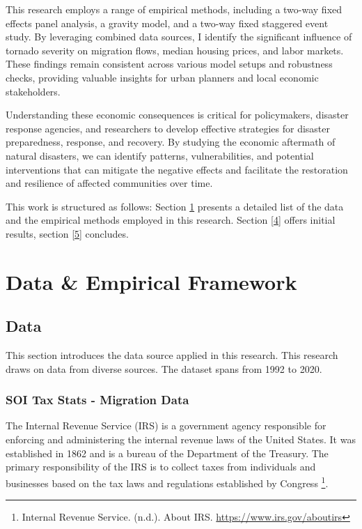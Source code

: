 \documentclass[letterpaper]{article}
\begin{document}
This research employs a range of empirical methods, including a two-way fixed effects panel analysis, a gravity model, and a two-way fixed staggered event study. By leveraging combined data sources, I identify the significant influence of tornado severity on migration flows, median housing prices, and labor markets. These findings remain consistent across various model setups and robustness checks, providing valuable insights for urban planners and local economic stakeholders.

Understanding these economic consequences is critical for policymakers, disaster response agencies, and researchers to develop effective strategies for disaster preparedness, response, and recovery. By studying the economic aftermath of natural disasters, we can identify patterns, vulnerabilities, and potential interventions that can mitigate the negative effects and facilitate the restoration and resilience of affected communities over time. 

This work is structured as follows: Section \ref{3} presents a detailed list of the data and the empirical methods employed in this research. Section \ref{4} offers initial results, section \ref{5} concludes.

\section{Data \& Empirical Framework}
\label{3}
\subsection{Data}
This section introduces the data source applied in this research. This research draws on data from diverse sources. The dataset spans from 1992 to 2020.

\subsubsection{SOI Tax Stats - Migration Data}

The Internal Revenue Service (IRS) is a government agency responsible for enforcing and administering the internal revenue laws of the United States. It was established in 1862 and is a bureau of the Department of the Treasury. The primary responsibility of the IRS is to collect taxes from individuals and businesses based on the tax laws and regulations established by Congress \footnote{Internal Revenue Service. (n.d.). About IRS. \url{https://www.irs.gov/aboutirs}}. 
\end{document}
